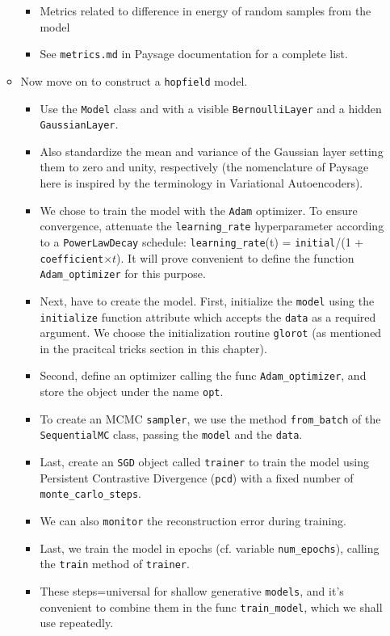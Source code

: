 \documentclass[norsk,a4paper,11pt]{article}
\begin{document}
\begin{itemize}
\begin{itemize}
\begin{itemize}
			\item Metrics related to difference in energy of random samples from the model
			\item See \texttt{metrics.md} in Paysage documentation for a complete list.
		\end{itemize}
		\item Now move on to construct a \texttt{hopfield} model.
		\begin{itemize}
			\item Use the \texttt{Model} class and with a visible \texttt{BernoulliLayer} and a hidden \texttt{GaussianLayer}.
			\item Also standardize the mean and variance of the Gaussian layer setting them to zero and unity, respectively (the nomenclature of Paysage here is inspired by the terminology in Variational Autoencoders).
			\item We chose to train the model with the \texttt{Adam} optimizer. To ensure convergence, attenuate the \texttt{learning\_rate} hyperparameter according to a \texttt{PowerLawDecay} schedule: \texttt{learning\_rate}(t) = \texttt{initial}/(1 + \texttt{coefficient}$\times t$). It will prove convenient to define the function \texttt{Adam\_optimizer} for this purpose.
			\item Next, have to create the model. First, initialize the \texttt{model} using the \texttt{initialize} function attribute which accepts the \texttt{data} as a required argument. We choose the initialization routine \texttt{glorot} (as mentioned in the pracitcal tricks section in this chapter).
			\item Second, define an optimizer calling the func \texttt{Adam\_optimizer}, and store the object under the name \texttt{opt}. 
			\item To create an MCMC \texttt{sampler}, we use the method \texttt{from\_batch} of the \texttt{SequentialMC} class, passing the \texttt{model} and the \texttt{data}. 
			\item Last, create an \texttt{SGD} object called \texttt{trainer} to train the model using Persistent Contrastive Divergence (\texttt{pcd}) with a fixed number of \texttt{monte\_carlo\_steps}.
			\item We can also \texttt{monitor} the reconstruction error during training.
			\item Last, we train the model in epochs (cf. variable \texttt{num\_epochs}), calling the \texttt{train} method of \texttt{trainer}.
			\item These steps=universal for shallow generative \texttt{models}, and it's convenient to combine them in the func \texttt{train\_model}, which we shall use repeatedly.

\end{itemize}
\end{itemize}
\end{itemize}
\end{document}
